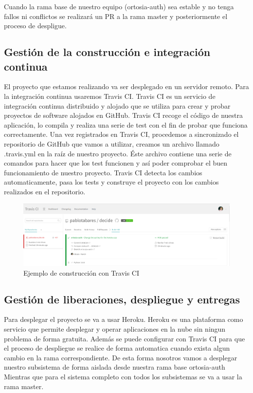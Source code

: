 \documentclass[12pt]{article}
\begin{document}
Cuando la rama base de nuestro equipo (ortosia-auth) sea estable y no tenga  fallos ni conflictos se realizará un PR a la rama master y posteriormente el proceso de despligue. 



\subsection{Gestión de la construcción e integración continua}
El proyecto que estamos realizando va ser desplegado en un servidor remoto. Para la integración continua usaremos Travis CI.
Travis CI es un servicio de integración continua distribuido y alojado que se utiliza para crear y probar proyectos de software alojados en GitHub. Travis CI recoge el código de nuestra aplicación, lo compila y realiza una serie de test con el fin de probar que funciona correctamente.
Una vez registrados en Travis CI, procedemos a sincronizado el repositorio de GitHub que vamos a utilizar, creamos un archivo llamado .travis.yml en la raíz de nuestro proyecto. Éste archivo contiene una serie de comandos para hacer que los test funcionen y así poder comprobar el buen funcionamiento de nuestro proyecto.
Travis CI detecta los cambios automaticamente, pasa los tests y construye el proyecto con los cambios realizados en el repositorio.

\begin{figure}[hbt!]
\centering
\includegraphics[width=1\textwidth]{travis.png}
\caption{Ejemplo de construcción con Travis CI}
\end{figure}


\subsection{Gestión de liberaciones, despliegue y entregas}

Para desplegar el proyecto se va a usar Heroku. Heroku es una plataforma como servicio que permite desplegar y operar aplicaciones en la nube sin ningun problema de forma gratuita.
Además se puede configurar con Travis CI para que el proceso de despliegue se realice de forma automatica cuando exista algun cambio en la rama correspondiente. De esta forma nosotros vamos a desplegar nuestro subsistema de forma aislada desde nuestra rama base ortosia-auth
Mientras que para el sistema completo con todos los subsistemas se va a usar la rama master.
\end{document}
